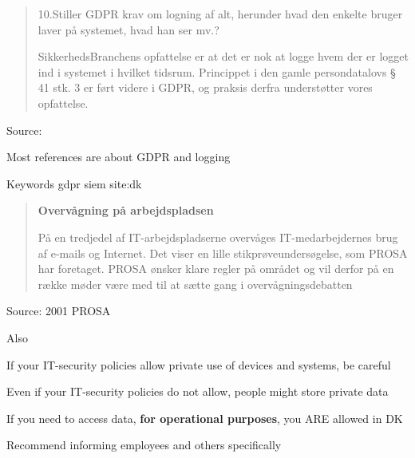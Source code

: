 \documentclass[Screen16to9,17pt]{foils}
\begin{document}


\begin{quote}
  10.Stiller GDPR krav om logning af alt, herunder hvad den enkelte bruger laver på
  systemet, hvad han ser mv.?

  SikkerhedsBranchens opfattelse er at det er nok at logge hvem der er logget ind i
  systemet i hvilket tidsrum. Princippet i den gamle persondatalovs § 41 stk. 3 er
  ført videre i GDPR, og praksis derfra understøtter vores opfattelse.
\end{quote}
Source: 

\begin{list2}
\item Most references are about GDPR and logging
\item Keywords gdpr siem site:dk
  \item {}
\end{list2}




\begin{quote}{\bf
  Overvågning på arbejdspladsen}

  På en tredjedel af IT-arbejdspladserne overvåges IT-medarbejdernes brug af e-mails og Internet. Det viser en lille stikprøveundersøgelse, som PROSA har foretaget. PROSA ønsker klare regler på området og vil derfor på en række møder være med til at sætte gang i overvågningsdebatten
\end{quote}
Source: 2001 PROSA {\footnotesize{}}

\begin{list2}
  \item Also {\footnotesize{}}
\item If your IT-security policies allow private use of devices and systems, be careful
\item Even if your IT-security policies do not allow, people might store private data
\item If you need to access data, {\bf for operational purposes}, you ARE allowed in DK
\item Recommend informing employees and others specifically
\end{list2}
\end{document}
